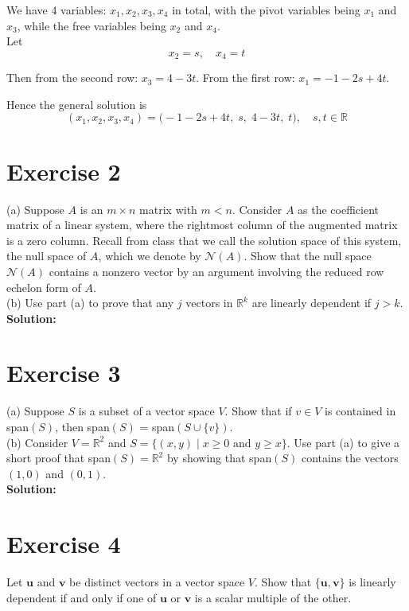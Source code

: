 \documentclass{article}
\begin{document}
We have 4 variables: \(x_1,x_2,x_3,x_4\) in total, with the pivot variables being \(x_1\) and \(x_3\), while the free variables being \(x_2\) and \(x_4\). \\

Let 
\[
x_2 = s,
\quad
x_4 = t
\]

Then from the second row: \(x_3 = 4 - 3t\).  
From the first row: \(x_1 = -1 - 2s + 4t\).

Hence the general solution is
\[
(x_1, x_2, x_3, x_4)
=
\bigl(-1 - 2s + 4t,\; s,\; 4 - 3t,\; t\bigr), \quad s,t \in \mathbb{R}
\]

\newpage

\section*{Exercise 2}
(a) Suppose $A$ is an $m \times n$ matrix with $m < n$. Consider $A$ as the coefficient matrix of a linear system, where the rightmost column of the augmented matrix is a zero column. Recall from class that we call the solution space of this system, the null space of $A$, which we denote by $\mathcal{N}(A)$. Show that the null space $\mathcal{N}(A)$ contains a nonzero vector by an argument involving the reduced row echelon form of $A$. \\

\noindent
(b) Use part (a) to prove that any $j$ vectors in $\mathbb{R}^k$ are linearly dependent if $j > k$. \\

\textbf{Solution:}
\newpage

\section*{Exercise 3}
(a) Suppose $S$ is a subset of a vector space $V$. Show that if $v \in V$ is contained in span$(S)$, then span$(S)$ = span$(S \cup \{v\})$. \\

\noindent
(b) Consider $V = \mathbb{R}^2$ and $S = \{(x,y) \mid x \geq 0 \text{ and } y \geq x\}$. Use part (a) to give a short proof that span$(S) = \mathbb{R}^2$ by showing that span$(S)$ contains the vectors $(1,0)$ and $(0,1)$. \\

\textbf{Solution:}
\newpage

\section*{Exercise 4}
Let $\mathbf{u}$ and $\mathbf{v}$ be distinct vectors in a vector space $V$. Show that $\{\mathbf{u}, \mathbf{v}\}$ is linearly dependent if and only if one of $\mathbf{u}$ or $\mathbf{v}$ is a scalar multiple of the other. \\
\end{document}
